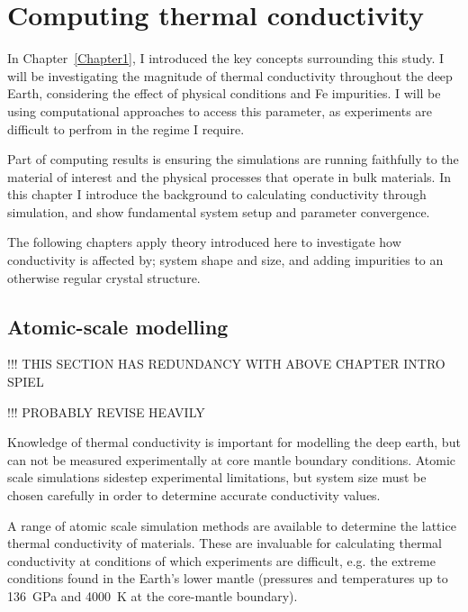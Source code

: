\chapter{Computing thermal conductivity} 

\label{Chapter2} 

In Chapter~\ref{Chapter1}, I introduced the key concepts surrounding this study. I will be investigating the magnitude of thermal conductivity throughout the deep Earth, considering the effect of physical conditions and Fe impurities. I will be using computational approaches to access this parameter, as experiments are difficult to perfrom in the regime I require. 

Part of computing results is ensuring the simulations are running faithfully to the material of interest and the physical processes that operate in bulk materials. In this chapter I introduce the background to calculating conductivity through simulation, and show fundamental system setup and parameter convergence. 

The following chapters apply theory introduced here to investigate how conductivity is affected by; system shape and size, and adding impurities to an otherwise regular crystal structure.

\section{Atomic-scale modelling}

!!! THIS SECTION HAS REDUNDANCY WITH ABOVE CHAPTER INTRO SPIEL

!!! PROBABLY REVISE HEAVILY

Knowledge of thermal conductivity is important for modelling the deep earth, but can not be measured experimentally at core mantle boundary conditions. Atomic scale simulations sidestep experimental limitations, but system size must be chosen carefully in order to determine accurate conductivity values. 

A range of atomic scale simulation methods are available to determine the lattice thermal conductivity of materials. These are invaluable for calculating thermal conductivity at conditions of which experiments are difficult, e.g. the extreme conditions found in the Earth's lower mantle (pressures and temperatures up to 136~GPa and 4000~K at the core-mantle boundary). 

